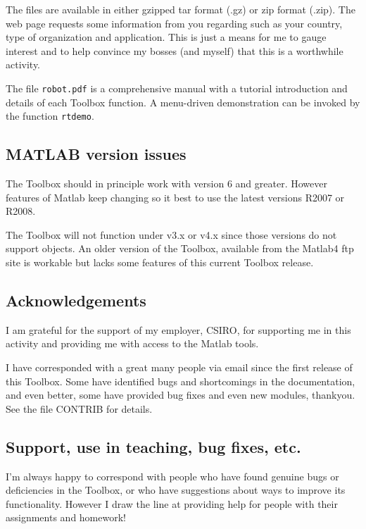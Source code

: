 \documentclass{article}
\newcommand{\var}[1]{{\vtt #1}}
\begin{document}
The files are available in either gzipped tar format (.gz) or zip
format (.zip).  The web page requests some information from you
regarding such as your country, type of organization and application.
This is just a means for me to gauge interest and to help convince my
bosses (and myself) that this is a worthwhile activity.

The file {\tt robot.pdf} is a comprehensive manual with a tutorial introduction
and details of each Toolbox function.
A menu-driven demonstration can be invoked by the function {\tt rtdemo}.

\subsection{MATLAB version issues}
The Toolbox should in principle work with {\Mlab} version 6 and greater.  However features of
Matlab keep changing so it best to use the latest versions R2007 or R2008.

The Toolbox will not function under {\Mlab} v3.x or v4.x since those versions
do not support objects.  An older version of the Toolbox, available from
the Matlab4 ftp site is workable but lacks some features of this current
Toolbox release.


\subsection{Acknowledgements}
I am grateful for the support of my employer, CSIRO, for supporting me in
this activity and providing me with access to the Matlab tools.

I have corresponded with a great many people via email since the first 
release of this Toolbox.  Some have identified bugs and shortcomings
in the documentation, and even better, some have provided bug fixes and
even new modules, thankyou.  See the file \var{CONTRIB} for details.

\subsection{Support, use in teaching, bug fixes, etc.}
I'm always happy to correspond with people who have found genuine
bugs or deficiencies
in the Toolbox, or who have suggestions about ways to improve its
functionality.  However I draw the line at providing help for people
with their assignments and homework!
\end{document}
